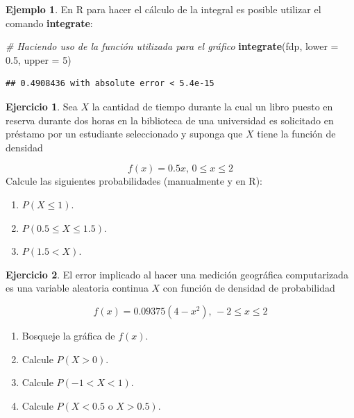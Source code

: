 \documentclass[
  11pt,
]{book}
\newenvironment{Shaded}{\begin{snugshade}}{\end{snugshade}}
\newcommand{\AttributeTok}[1]{\textcolor[rgb]{0.13,0.29,0.53}{#1}}
\newcommand{\CommentTok}[1]{\textcolor[rgb]{0.56,0.35,0.01}{\textit{#1}}}
\newcommand{\DecValTok}[1]{\textcolor[rgb]{0.00,0.00,0.81}{#1}}
\newcommand{\FloatTok}[1]{\textcolor[rgb]{0.00,0.00,0.81}{#1}}
\newcommand{\FunctionTok}[1]{\textcolor[rgb]{0.13,0.29,0.53}{\textbf{#1}}}
\newcommand{\NormalTok}[1]{#1}
\theoremstyle{definition}
\theoremstyle{definition}
\newtheorem{example}{Ejemplo}[chapter]
\theoremstyle{definition}
\newtheorem{exercise}{Ejercicio}[chapter]
\theoremstyle{definition}
\theoremstyle{remark}
\begin{document}
\begin{example}
En R para hacer el cálculo de la integral es posible utilizar el comando \textbf{integrate}:

\begin{Shaded}
\begin{Highlighting}[]
\CommentTok{\# Haciendo uso de la función utilizada para el gráfico}
\FunctionTok{integrate}\NormalTok{(fdp, }\AttributeTok{lower =} \FloatTok{0.5}\NormalTok{, }\AttributeTok{upper =} \DecValTok{5}\NormalTok{)}
\end{Highlighting}
\end{Shaded}

\begin{verbatim}
## 0.4908436 with absolute error < 5.4e-15
\end{verbatim}

\end{example}

\begin{exercise}

Sea \(X\) la cantidad de tiempo durante la cual un libro puesto en reserva durante dos horas en la biblioteca de una universidad es solicitado en préstamo por un estudiante seleccionado y suponga que \(X\) tiene la función de densidad

\[f(x) = 0.5x \text{, } 0\leq x \leq 2\]
Calcule las siguientes probabilidades (manualmente y en R):

\begin{enumerate}
\def\labelenumi{\alph{enumi}.}
\item
  \(P(X \leq 1)\).
\item
  \(P(0.5 \leq X \leq 1.5)\).
\item
  \(P(1.5 < X)\).
\end{enumerate}

\end{exercise}

\begin{exercise}

El error implicado al hacer una medición geográfica computarizada es una variable aleatoria continua \(X\) con función de densidad de probabilidad

\[f(x) = 0.09375(4-x^2) \text{, } -2\leq x \leq 2\]

\begin{enumerate}
\def\labelenumi{\alph{enumi}.}
\item
  Bosqueje la gráfica de \(f(x)\).
\item
  Calcule \(P(X > 0)\).
\item
  Calcule \(P(-1 < X < 1)\).
\item
  Calcule \(P(X < 0.5 \text{ o } X > 0.5)\).
\end{enumerate}

\end{exercise}
\end{document}
